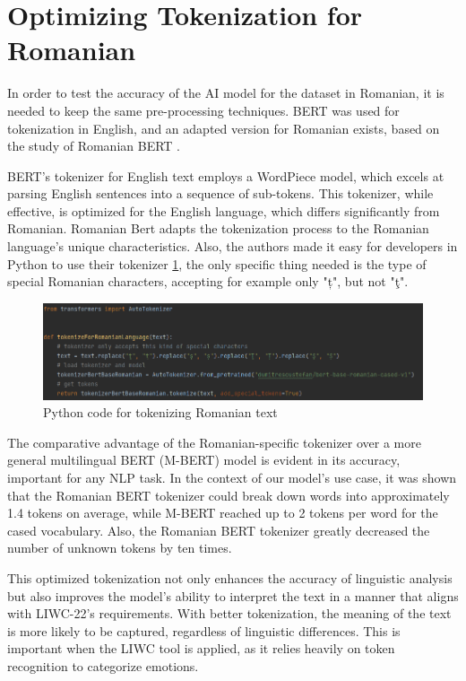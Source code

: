 \section{Optimizing Tokenization for Romanian}

\quad In order to test the accuracy of the AI model for the dataset in Romanian, it is needed to keep the same pre-processing techniques. BERT \cite{bertTokenizerEnglish} was used for tokenization in English, and an adapted version for Romanian exists, based on the study of Romanian BERT \cite{dumitrescu2020birth}.

BERT's tokenizer for English text employs a WordPiece model\cite{wu2016google}, which excels at parsing English sentences into a sequence of sub-tokens. This tokenizer, while effective, is optimized for the English language, which differs significantly from Romanian. Romanian Bert \cite{dumitrescu2020birth} adapts the tokenization process to the Romanian language's unique characteristics.  Also, the authors made it easy for developers in Python to use their tokenizer \ref{codeTokenizerRo}, the only specific thing needed is the type of special Romanian characters, accepting for example only "ț", but not "ţ".

\begin{figure}[htbp]
	\centering
		\includegraphics[scale=0.85]{LaTeX Bachelor Thesis Depression Signs Detection/figures/codeTokenizeRo.png}
	\caption{Python code for tokenizing Romanian text}
	\label{codeTokenizerRo}
\end{figure}


The comparative advantage of the Romanian-specific tokenizer over a more general multilingual BERT (M-BERT) model is evident in its accuracy, important for any NLP task. In the context of our model’s use case, it was shown that the Romanian BERT tokenizer could break down words into approximately 1.4 tokens on average, while M-BERT reached up to 2 tokens per word for the cased vocabulary. 
Also, the Romanian BERT tokenizer greatly decreased the number of unknown tokens by ten times\cite{dumitrescu2020birth}.

This optimized tokenization not only enhances the accuracy of linguistic analysis but also improves the model’s ability to interpret the text in a manner that aligns with LIWC-22's \cite{boyd2022development} requirements. With better tokenization, the meaning of the text is more likely to be captured, regardless of linguistic differences. This is important when the LIWC tool is applied, as it relies heavily on token recognition to categorize emotions.

